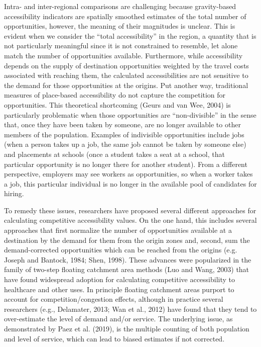 \documentclass[]{elsarticle} %
\begin{document}
Intra- and inter-regional comparisons are challenging because
gravity-based accessibility indicators are spatially smoothed estimates
of the total number of opportunities, however, the meaning of their
magnitudes is unclear. This is evident when we consider the ``total
accessibility'' in the region, a quantity that is not particularly
meaningful since it is not constrained to resemble, let alone match the
number of opportunities available. Furthermore, while accessibility
depends on the supply of destination opportunities weighted by the
travel costs associated with reaching them, the calculated
accessibilities are not sensitive to the demand for those opportunities
at the origins. Put another way, traditional measures of place-based
accessibility do not capture the competition for opportunities. This
theoretical shortcoming (Geurs and van Wee, 2004) is particularly
problematic when those opportunities are ``non-divisible'' in the sense
that, once they have been taken by someone, are no longer available to
other members of the population. Examples of indivisible opportunities
include jobs (when a person takes up a job, the same job cannot be taken
by someone else) and placements at schools (once a student takes a seat
at a school, that particular opportunity is no longer there for another
student). From a different perspective, employers may see workers as
opportunities, so when a worker takes a job, this particular individual
is no longer in the available pool of candidates for hiring.

To remedy these issues, researchers have proposed several different
approaches for calculating competitive accessibility values. On the one
hand, this includes several approaches that first normalize the number
of opportunities available at a destination by the demand for them from
the origin zones and, second, sum the demand-corrected opportunities
which can be reached from the origins (e.g. Joseph and Bantock, 1984;
Shen, 1998). These advances were popularized in the family of two-step
floating catchment area methods (Luo and Wang, 2003) that have found
widespread adoption for calculating competitive accessibility to
healthcare and other uses. In principle floating catchment areas purport
to account for competition/congestion effects, although in practice
several researchers (e.g., Delamater, 2013; Wan et al., 2012) have found
that they tend to over-estimate the level of demand and/or service. The
underlying issue, as demonstrated by Paez et al. (2019), is the multiple
counting of both population and level of service, which can lead to
biased estimates if not corrected.
\end{document}
